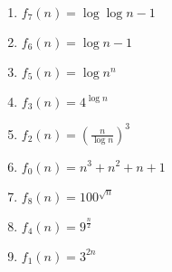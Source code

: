 \documentclass[12pt]{article}
\begin{document}
\begin{enumerate}
\item \begin{math}f_7(n) = \log{\log{n-1}}\end{math}
\item \begin{math}f_6(n) = \log{n-1}\end{math}
\item \begin{math}f_5(n) = \log{n^n}\end{math}
\item \begin{math}f_3(n) = 4^{\log{n}}\end{math}
\item \begin{math}f_2(n) = (\frac{n}{\log{n}})^3\end{math}
\item \begin{math}f_0(n) = n^3 + n^2 + n + 1\end{math}
\item \begin{math}f_8(n) = 100^{\sqrt{n}}\end{math}
\item \begin{math}f_4(n) = 9^{\frac{n}{2}}\end{math}
\item \begin{math}f_1(n) = 3^{2n}\end{math}
\end{enumerate}
\end{document}
